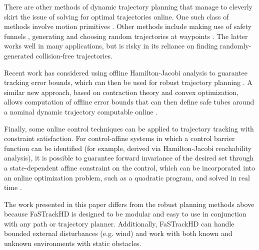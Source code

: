 There are other methods of dynamic trajectory planning that manage to cleverly skirt the issue of solving for optimal trajectories online.  One such class of methods involve motion primitives \cite{Gillula2010, Dey2016}. Other methods include making use of safety funnels \cite{Majumdar2016},  generating and choosing random trajectories at waypoints \cite{Kalakrishnan2011, Schwesinger2013}. The latter works well in many applications, but is risky in its reliance on finding randomly-generated collision-free trajectories. 

Recent work has considered using offline Hamilton-Jacobi analysis to guarantee tracking error bounds, which can then be used for robust trajectory planning \cite{Bansal2017}. A similar new approach, based on contraction theory and convex optimization, allows computation of offline error bounds that can then define safe tubes around a nominal dynamic trajectory computable online \cite{Singh2017}.

Finally, some online control techniques can be applied to trajectory tracking with constraint satisfaction. For control-affine systems in which a control barrier function can be identified (for example, derived via Hamilton-Jacobi reachability analysis), it is possible to guarantee forward invariance of the desired set through a state-dependent affine constraint on the control, which can be incorporated into an online optimization problem, such as a quadratic program, and solved in real time \cite{Ames2014}. %

The work presented in this paper differs from the robust planning methods above because FaSTrackHD is designed to be modular and easy to use in conjunction with any path or trajectory planner. Additionally, FaSTrackHD can handle bounded external disturbances (e.g. wind) and work with both known and unknown environments with static obstacles.